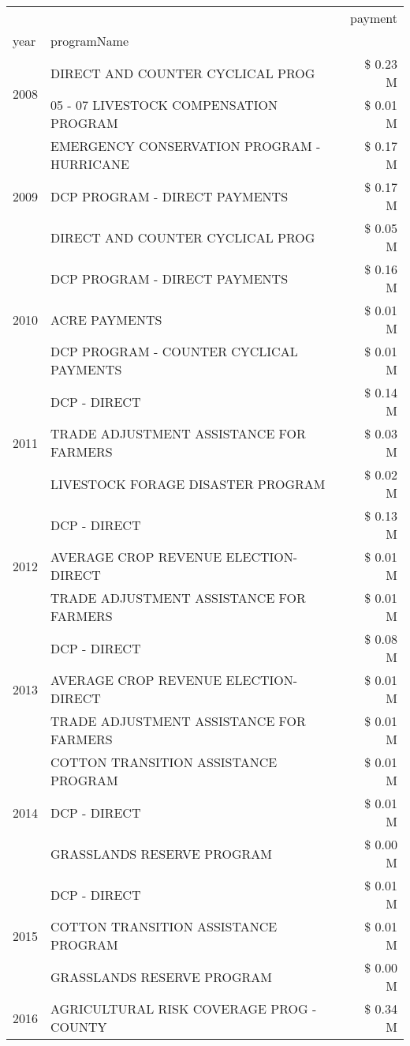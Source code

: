 \begin{tabular}{llr}
\toprule
 &  & payment \\
year & programName &  \\
\midrule
\multirow[t]{2}{*}{2008} & DIRECT AND COUNTER CYCLICAL PROG & \$ 0.23 M \\
 & 05 - 07 LIVESTOCK COMPENSATION PROGRAM & \$ 0.01 M \\
\cline{1-3}
\multirow[t]{3}{*}{2009} & EMERGENCY CONSERVATION PROGRAM - HURRICANE & \$ 0.17 M \\
 & DCP PROGRAM - DIRECT PAYMENTS & \$ 0.17 M \\
 & DIRECT AND COUNTER CYCLICAL PROG & \$ 0.05 M \\
\cline{1-3}
\multirow[t]{3}{*}{2010} & DCP PROGRAM - DIRECT PAYMENTS & \$ 0.16 M \\
 & ACRE PAYMENTS & \$ 0.01 M \\
 & DCP PROGRAM - COUNTER CYCLICAL PAYMENTS & \$ 0.01 M \\
\cline{1-3}
\multirow[t]{3}{*}{2011} & DCP - DIRECT & \$ 0.14 M \\
 & TRADE ADJUSTMENT ASSISTANCE FOR FARMERS & \$ 0.03 M \\
 & LIVESTOCK FORAGE DISASTER PROGRAM & \$ 0.02 M \\
\cline{1-3}
\multirow[t]{3}{*}{2012} & DCP - DIRECT & \$ 0.13 M \\
 & AVERAGE CROP REVENUE ELECTION-DIRECT & \$ 0.01 M \\
 & TRADE ADJUSTMENT ASSISTANCE FOR FARMERS & \$ 0.01 M \\
\cline{1-3}
\multirow[t]{3}{*}{2013} & DCP - DIRECT & \$ 0.08 M \\
 & AVERAGE CROP REVENUE ELECTION-DIRECT & \$ 0.01 M \\
 & TRADE ADJUSTMENT ASSISTANCE FOR FARMERS & \$ 0.01 M \\
\cline{1-3}
\multirow[t]{3}{*}{2014} & COTTON TRANSITION ASSISTANCE PROGRAM & \$ 0.01 M \\
 & DCP - DIRECT & \$ 0.01 M \\
 & GRASSLANDS RESERVE PROGRAM & \$ 0.00 M \\
\cline{1-3}
\multirow[t]{3}{*}{2015} & DCP - DIRECT & \$ 0.01 M \\
 & COTTON TRANSITION ASSISTANCE PROGRAM & \$ 0.01 M \\
 & GRASSLANDS RESERVE PROGRAM & \$ 0.00 M \\
\cline{1-3}
\multirow[t]{3}{*}{2016} & AGRICULTURAL RISK COVERAGE PROG - COUNTY & \$ 0.34 M \\

\end{tabular}
